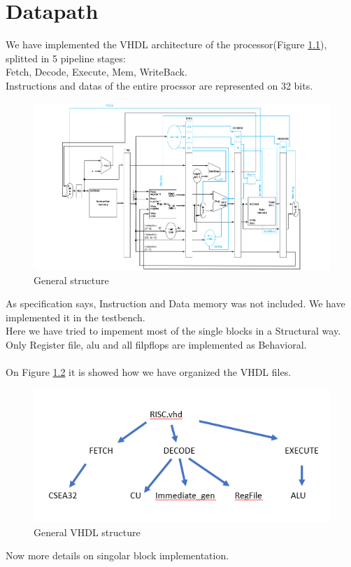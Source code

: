 \chapter{Datapath}
We have implemented the VHDL architecture of the processor(Figure \ref{fig1}), splitted in 5 pipeline stages: \\
Fetch, Decode, Execute, Mem, WriteBack. \\
Instructions and datas of the entire procssor are represented on 32 bits. 
\begin{figure}[h!]
	\centering
	\includegraphics[width=18cm]{./images/structure}
	\caption{General structure}
	\label{fig1}
\end{figure}
As specification says, Instruction and Data memory was not included. We have implemented it in the testbench.\\
Here we have tried to impement most of the single blocks in a Structural way. \\
Only Register file, alu and all filpflops are implemented as Behavioral.\\
\\
On Figure \ref{fig2} it is showed how we have organized the VHDL files.
\begin{figure}[h!]
	\centering
	\includegraphics[width=15cm]{./images/VHDL_structure}
	\caption{General VHDL structure}
	\label{fig2}
\end{figure}
Now more details on singolar block implementation.
